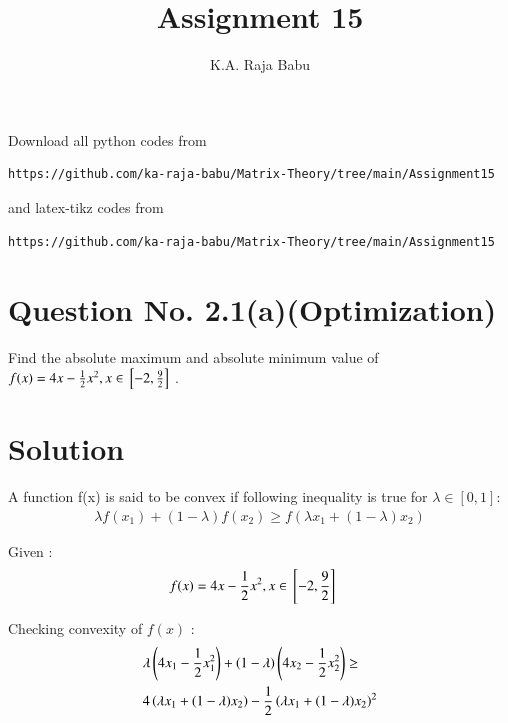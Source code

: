 \documentclass[journal,12pt,twocolumn]{IEEEtran}
\begin{document}
\makeatother
\let\StandardTheFigure\thefigure
\let\vec\mathbf
\renewcommand{\thefigure}{\theproblem}
\def\putbox#1#2#3{\makebox[0in][l]{\makebox[#1][l]{}\raisebox{\baselineskip}[0in][0in]{\raisebox{#2}[0in][0in]{#3}}}}
     \def\rightbox#1{\makebox[0in][r]{#1}}
     \def\centbox#1{\makebox[0in]{#1}}
     \def\topbox#1{\raisebox{-\baselineskip}[0in][0in]{#1}}
     \def\midbox#1{\raisebox{-0.5\baselineskip}[0in][0in]{#1}}
\vspace{3cm}
\title{Assignment 15}
\author{K.A. Raja Babu}
\maketitle
\newpage
\bigskip
\renewcommand{\thefigure}{\theenumi}
\renewcommand{\thetable}{\theenumi}
Download all python codes from 
\begin{lstlisting}
https://github.com/ka-raja-babu/Matrix-Theory/tree/main/Assignment15
\end{lstlisting}
%
and latex-tikz codes from 
%
\begin{lstlisting}
https://github.com/ka-raja-babu/Matrix-Theory/tree/main/Assignment15
\end{lstlisting}
%
\section{Question No. 2.1(a)(Optimization)}

Find the absolute maximum and absolute minimum value of $f(x)=4x-\frac{1}{2}x^2,x \in {}\left[-2,\frac{9}{2}\right]$ .

\section{Solution}

\begin{lemma}
A function f(x) is said to be convex if following inequality is true for $\lambda \in [0,1] :$  \label{lemma1}
\begin{align}
    \lambda f(x_1) + (1-\lambda)f(x_2) \geq f(\lambda x_1 + (1-\lambda)x_2)
\end{align}
\end{lemma}

Given :
\begin{align}
    f(x) &= 4x-\frac{1}{2}x^2 , x \in {}\left[-2,\frac{9}{2}\right]
\end{align}

Checking convexity of $f(x)$ :
\begin{equation}
\begin{aligned}
    &\lambda\left(4x_1-\frac{1}{2}x_1^2\right) + (1-\lambda)\left(4x_2-\frac{1}{2}x_2^2\right) \geq \\
    &4\left(\lambda x_1 + (1-\lambda)x_2\right) - \frac{1}{2}\left(\lambda x_1 + (1-\lambda)x_2\right)^2
\end{aligned}
\end{equation}
\end{document}
